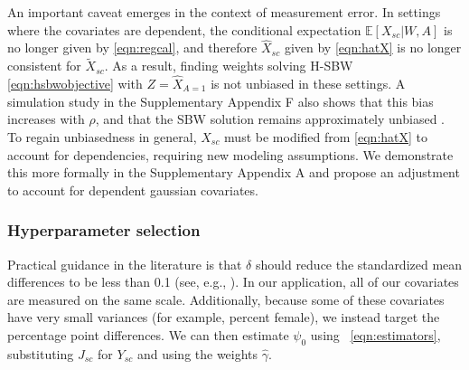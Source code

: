\documentclass[aoas]{imsart}
\theoremstyle{plain}
\theoremstyle{remark}
\begin{document}
An important caveat emerges in the context of measurement error. In settings where the covariates are dependent, the conditional expectation $\mathbb{E}[X_{sc}|W,A]$ is no longer given by \eqref{eqn:regcal}, and therefore $\hat{X}_{sc}$ given by \eqref{eqn:hatX} is no longer consistent for $\tilde{X}_{sc}$. As a result, finding weights solving H-SBW \eqref{eqn:hsbwobjective} with $Z = \hat{X}_{A=1}$ is not unbiased in these settings. A simulation study in the Supplementary Appendix F also shows that this bias increases with $\rho$, and that the SBW solution remains approximately unbiased \citep{supplement}. To regain unbiasedness in general, $\hat{X}_{sc}$ must be modified from \eqref{eqn:hatX} to account for dependencies, requiring new modeling assumptions. We demonstrate this more formally in the Supplementary Appendix A and propose an adjustment to account for dependent gaussian covariates.

\subsubsection{Hyperparameter selection} \label{ssec:delta}

Practical guidance in the literature is that $\delta$ should reduce the standardized mean differences to be less than 0.1 (see, e.g., \citet{zhang2019balance}). In our application, all of our covariates are measured on the same scale. Additionally, because some of these covariates have very small variances (for example, percent female), we instead target the percentage point differences. We can then estimate $\psi_0$ using ~\eqref{eqn:estimators}, substituting $J_{sc}$ for $Y_{sc}$ and using the weights $\hat{\gamma}$.
\end{document}
